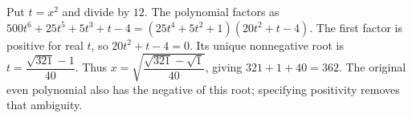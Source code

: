 Put $t=x^2$ and divide by $12$. The polynomial factors as $500t^6+25t^5+5t^3+t-4=(25t^4+5t^2+1)(20t^2+t-4)$. The first factor is positive for real $t$, so $20t^2+t-4=0$. Its unique nonnegative root is $t=\dfrac{\sqrt{321}-1}{40}$. Thus $x=\sqrt{\dfrac{\sqrt{321}-\sqrt1}{40}}$, giving $\boxed{321+1+40=362}$. The original even polynomial also has the negative of this root; specifying positivity removes that ambiguity.
